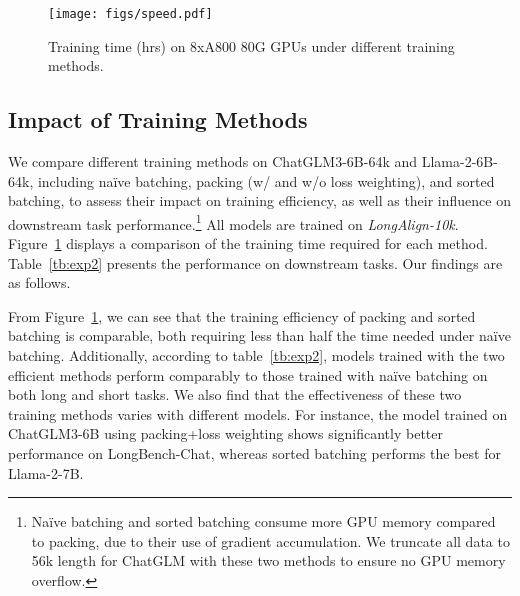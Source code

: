 \begin{figure}[t]
    \centering
    \texttt{[image: figs/speed.pdf]}
    \caption{Training time (hrs) on 8xA800 80G GPUs under different training methods.}
    \label{fig:efficiency}
\end{figure}

\subsection{Impact of Training Methods}
We compare different training methods on ChatGLM3-6B-64k and Llama-2-6B-64k, including naïve batching, packing (w/ and w/o loss weighting), and sorted batching, to assess their impact on training efficiency, as well as their influence on downstream task performance.\footnote{Naïve batching and sorted batching consume more GPU memory compared to packing, due to their use of gradient accumulation. We truncate all data to 56k length for ChatGLM with these two methods to ensure no GPU memory overflow.}
All models are trained on \emph{LongAlign-10k}.
Figure~\ref{fig:efficiency} displays a comparison of the training time required for each method. Table~\ref{tb:exp2} presents the performance on downstream tasks.
Our findings are as follows.

\begin{table*}[t]
\centering  
{}
\caption{Scaling up: LongAlign on LLama-2-13B.}
\label{tb:exp3}
\end{table*}

From Figure~\ref{fig:efficiency}, we can see that the training efficiency of packing and sorted batching is comparable, both requiring less than half the time needed under naïve batching. Additionally, according to table~\ref{tb:exp2}, models trained with the two efficient methods perform comparably to those trained with naïve batching on both long and short tasks. 
We also find that the effectiveness of these two training methods varies with different models. 
For instance, the model trained on ChatGLM3-6B using packing+loss weighting shows significantly better performance on LongBench-Chat, whereas sorted batching performs the best for Llama-2-7B.

